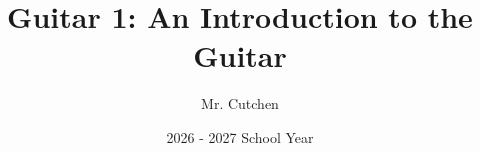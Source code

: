 \documentclass[a4paper,12pt]{book}
\begin{document}
	
\setlength{\parskip}{1em}

\author{Mr. Cutchen}
\title{Guitar 1: An Introduction to the Guitar}
\date{2026 - 2027 School Year}

\frontmatter
\maketitle
\tableofcontents

\mainmatter









\backmatter
\end{document}
